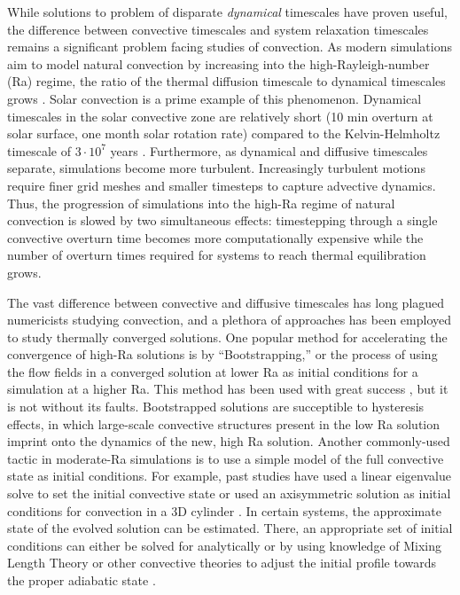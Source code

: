 \documentclass[aps, pre, onecolumn, nofootinbib, notitlepage, groupedaddress, amsfonts, amssymb, amsmath, longbibliography]{revtex4-1}
\begin{document}
While solutions to problem of disparate \emph{dynamical} timescales have proven useful,
the difference between convective timescales and system relaxation timescales remains
a significant problem facing studies of convection. 
As modern simulations aim to model natural convection
by increasing into the high-Rayleigh-number (Ra) regime,
the ratio of the thermal diffusion timescale to dynamical timescales
grows \cite{anders&brown2017}.
Solar convection is a prime example of this phenomenon.
Dynamical timescales in the solar convective zone are relatively short 
(10 min overturn at solar surface, one month solar
rotation rate) compared to the Kelvin-Helmholtz timescale of
$3 \cdot 10^7$ years \cite{stix2003}.  
Furthermore, as dynamical and diffusive timescales separate, 
simulations become more turbulent. Increasingly turbulent motions 
require finer grid meshes and smaller timesteps
to capture advective dynamics. Thus, the progression of simulations into the high-Ra
regime of natural convection is slowed by two simultaneous effects: timestepping
through a single convective overturn time becomes more computationally expensive
while the number of overturn times required for systems to reach thermal equilibration
grows.

The vast difference between convective and diffusive timescales has long plagued
numericists studying convection, and a plethora of approaches has been employed to
study thermally converged solutions. One popular method for accelerating the convergence
of high-Ra solutions is by ``Bootstrapping,'' or the process of using the flow
fields in a converged solution at lower Ra as initial conditions for a simulation at a higher
Ra.  This method has been used with great success \cite{johnston&doering2009, verzicco&camussi1997},
but it is not without its faults.  Bootstrapped solutions are succeptible to hysteresis
effects, in which large-scale convective structures present in the
low Ra solution imprint onto the dynamics of the new, high Ra solution. 
Another commonly-used tactic in
moderate-Ra simulations is to use 
a simple model of the full convective state as initial conditions.  
For example, past studies have used a linear eigenvalue solve to set the initial
convective state \cite{hurlburt&all1984} or used an axisymmetric solution 
as initial conditions for convection in a 3D cylinder \cite{verzicco&camussi1997}. 
In certain systems, 
the approximate state of the evolved solution can be estimated. There, an
appropriate set of initial conditions can either be solved for analytically
\cite{couston&all2017} or by using knowledge of Mixing Length Theory or other convective
theories to adjust the initial profile towards the proper adiabatic state \cite{brandenburg&all2005}.
\end{document}
